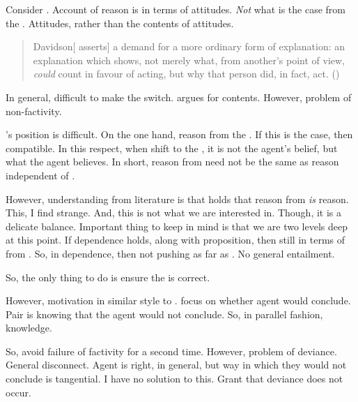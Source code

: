 \begin{note}
  Consider \citeauthor{Davidson:1963aa}.
  Account of reason is in terms of attitudes.
  \emph{Not} what is the case from the \agpe{}.
  Attitudes, rather than the contents of attitudes.

  \begin{quote}
    Davidson[ asserts] a demand for a more ordinary form of explanation:
    an explanation which shows, not merely what, from another's point of view, \emph{could} count in favour of acting, but why that person did, in fact, act.%
    \mbox{}\hfill\mbox{(\cite[417]{Hieronymi:2011aa})}
  \end{quote}

  In general, difficult to make the switch.
  \textcite{Dancy:2000aa} argues for contents.
  However, problem of non-factivity.

  \citeauthor{Dancy:2000aa}'s position is difficult.
  On the one hand, reason from the \agpe{}.
  If this is the case, then compatible.
  In this respect, when shift to the \agpe{}, it is not the agent's belief, but what the agent believes.
  In short, reason from \agpe{} need not be the same as reason independent of \agpe{}.

  However, understanding from literature is that \citeauthor{Dancy:2000aa} holds that reason from \agpe{} \emph{is} reason.
  This, I find strange.
  And, this is not what we are interested in.
  Though, it is a delicate balance.
  Important thing to keep in mind is that we are two levels deep at this point.
  If dependence holds, along with proposition, then still in terms of \ros{} from \agpe{}.
  So, in dependence, then not pushing as far as \citeauthor{Dancy:2000aa}.
  No general entailment.
\end{note}

\begin{note}
  So, the only thing to do is ensure the \agpe{} is correct.

  However, motivation in similar style to .
   focus on whether agent would conclude.
  Pair is knowing that the agent would not conclude.
  So, in parallel fashion, knowledge.
\end{note}

\begin{note}
  So, avoid failure of factivity for a second time.
  However, problem of deviance.
  General disconnect.
  Agent is right, in general, but way in which they would not conclude is tangential.
  I have no solution to this.
  Grant that deviance does not occur.
\end{note}

